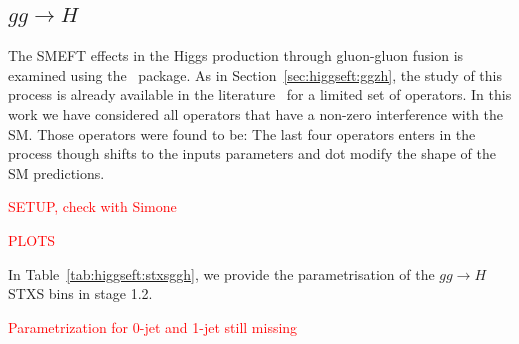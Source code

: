 \subsection{$gg\to H$}
\label{sec:higgseft:section3}
The SMEFT effects in the Higgs production through gluon-gluon fusion is examined using the \SMEFTatNLO\ package. As in Section~\ref{sec:higgseft:ggzh}, the 
study of this process is already available in the literature~\cite{Deutschmann:2017qum} for a limited set of operators. In this work we have considered all operators that have a non-zero interference with the SM. Those operators were found to be:
The last four operators enters in the process though shifts to the inputs parameters and dot modify the shape of the SM predictions.


 \textcolor{red}{ SETUP, check with Simone}


  
 \textcolor{red}{PLOTS}

  

 In Table~\ref{tab:higgseft:stxsggh}, we provide the parametrisation of the $gg\to H$ STXS bins in stage 1.2.

 
 \textcolor{red}{ Parametrization for 0-jet and 1-jet still missing}
 
